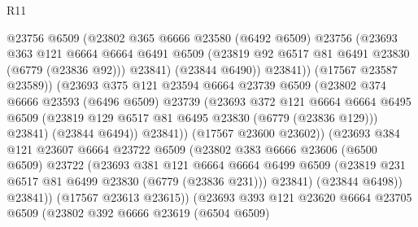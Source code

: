 \begin{lexlean}{R11}
\begin{coremodule}
{{{{{{{{{{{{{{{{{{{{{{{{{{{{{{{{{{{{{{{{{{{{{{{{{{{{{{{{{{{{{{{{{{{{{{{{{{{{{{{{{{                          @23756
                          @6509
                          (@23802
                            @365
                            @6666
                            @23580
                            (@6492 @6509)
                            @23756
                            (@23693
                              @363
                              @121
                              @6664
                              @6664
                              @6491
                              @6509
                              (@23819 @92 @6517 @81 @6491 @23830 (@6779 (@23836 @92)))
                              @23841)
                            (@23844 @6490))
                          @23841))
                      (@17567 @23587 @23589))
                    (@23693
                      @375
                      @121
                      @23594
                      @6664
                      @23739
                      @6509
                      (@23802
                        @374
                        @6666
                        @23593
                        (@6496 @6509)
                        @23739
                        (@23693
                          @372
                          @121
                          @6664
                          @6664
                          @6495
                          @6509
                          (@23819 @129 @6517 @81 @6495 @23830 (@6779 (@23836 @129)))
                          @23841)
                        (@23844 @6494))
                      @23841))
                  (@17567 @23600 @23602))
                (@23693
                  @384
                  @121
                  @23607
                  @6664
                  @23722
                  @6509
                  (@23802
                    @383
                    @6666
                    @23606
                    (@6500 @6509)
                    @23722
                    (@23693
                      @381
                      @121
                      @6664
                      @6664
                      @6499
                      @6509
                      (@23819 @231 @6517 @81 @6499 @23830 (@6779 (@23836 @231)))
                      @23841)
                    (@23844 @6498))
                  @23841))
              (@17567 @23613 @23615))
            (@23693
              @393
              @121
              @23620
              @6664
              @23705
              @6509
              (@23802
                @392
                @6666
                @23619
                (@6504 @6509)
}}}}}}}}}}}}}}}}}}}}}}}}}}}}}}}}}}}}}}}}}}}}}}}}}}}}}}}}}}}}}}}}}}}}}}}}}}}}}}}}}}
\end{coremodule}
\end{lexlean}
